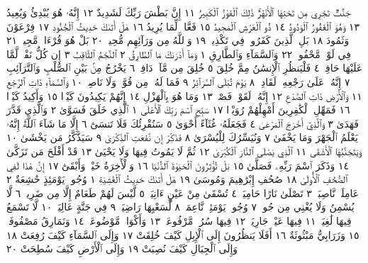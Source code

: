 جَنَّٰتࣱ تَجْرِي مِن تَحْتِهَا ٱلْأَنْهَٰرُۚ ذَٰلِكَ ٱلْفَوْزُ ٱلْكَبِيرُ ١١ إِنَّ بَطْشَ
رَبِّكَ لَشَدِيدٌ ١٢ إِنَّهُۥ هُوَ يُبْدِئُ وَيُعِيدُ ١٣ وَهُوَ ٱلْغَفُورُ ٱلْوَدُودُ ١٤
ذُو ٱلْعَرْشِ ٱلْمَجِيدُ ١٥ فَعَّالࣱ لِّمَا يُرِيدُ ١٦ هَلْ أَتَىٰكَ حَدِيثُ
ٱلْجُنُودِ ١٧ فِرْعَوْنَ وَثَمُودَ ١٨ بَلِ ٱلَّذِينَ كَفَرُوا۟ فِي تَكْذِيبࣲ ١٩ وَٱللَّهُ
مِن وَرَآئِهِم مُّحِيطُۢ ٢٠ بَلْ هُوَ قُرْءَانࣱ مَّجِيدࣱ ٢١ فِي لَوْحࣲ مَّحْفُوظِۭ ٢٢
وَٱلسَّمَآءِ وَٱلطَّارِقِ ١ وَمَآ أَدْرَىٰكَ مَا ٱلطَّارِقُ ٢ ٱلنَّجْمُ ٱلثَّاقِبُ ٣
إِن كُلُّ نَفْسࣲ لَّمَّا عَلَيْهَا حَافِظࣱ ٤ فَلْيَنظُرِ ٱلْإِنسَٰنُ مِمَّ خُلِقَ ٥
خُلِقَ مِن مَّآءࣲ دَافِقࣲ ٦ يَخْرُجُ مِنۢ بَيْنِ ٱلصُّلْبِ وَٱلتَّرَآئِبِ ٧ إِنَّهُۥ
عَلَىٰ رَجْعِهِۦ لَقَادِرࣱ ٨ يَوْمَ تُبْلَى ٱلسَّرَآئِرُ ٩ فَمَا لَهُۥ مِن قُوَّةࣲ وَلَا
نَاصِرࣲ ١٠ وَٱلسَّمَآءِ ذَاتِ ٱلرَّجْعِ ١١ وَٱلْأَرْضِ ذَاتِ ٱلصَّدْعِ ١٢
إِنَّهُۥ لَقَوْلࣱ فَصْلࣱ ١٣ وَمَا هُوَ بِٱلْهَزْلِ ١٤ إِنَّهُمْ يَكِيدُونَ كَيْدࣰا ١٥
وَأَكِيدُ كَيْدࣰا ١٦ فَمَهِّلِ ٱلْكَٰفِرِينَ أَمْهِلْهُمْ رُوَيْدَۢا ١٧
سَبِّحِ ٱسْمَ رَبِّكَ ٱلْأَعْلَى ١ ٱلَّذِي خَلَقَ فَسَوَّىٰ ٢ وَٱلَّذِي قَدَّرَ
فَهَدَىٰ ٣ وَٱلَّذِيٓ أَخْرَجَ ٱلْمَرْعَىٰ ٤ فَجَعَلَهُۥ غُثَآءً أَحْوَىٰ ٥
سَنُقْرِئُكَ فَلَا تَنسَىٰٓ ٦ إِلَّا مَا شَآءَ ٱللَّهُۚ إِنَّهُۥ يَعْلَمُ ٱلْجَهْرَ وَمَا يَخْفَىٰ ٧
وَنُيَسِّرُكَ لِلْيُسْرَىٰ ٨ فَذَكِّرْ إِن نَّفَعَتِ ٱلذِّكْرَىٰ ٩ سَيَذَّكَّرُ مَن يَخْشَىٰ ١٠
وَيَتَجَنَّبُهَا ٱلْأَشْقَى ١١ ٱلَّذِي يَصْلَى ٱلنَّارَ ٱلْكُبْرَىٰ ١٢ ثُمَّ لَا يَمُوتُ
فِيهَا وَلَا يَحْيَىٰ ١٣ قَدْ أَفْلَحَ مَن تَزَكَّىٰ ١٤ وَذَكَرَ ٱسْمَ رَبِّهِۦ فَصَلَّىٰ ١٥
بَلْ تُؤْثِرُونَ ٱلْحَيَوٰةَ ٱلدُّنْيَا ١٦ وَٱلْأٓخِرَةُ خَيْرࣱ وَأَبْقَىٰٓ ١٧ إِنَّ
هَٰذَا لَفِي ٱلصُّحُفِ ٱلْأُولَىٰ ١٨ صُحُفِ إِبْرَٰهِيمَ وَمُوسَىٰ ١٩
هَلْ أَتَىٰكَ حَدِيثُ ٱلْغَٰشِيَةِ ١ وُجُوهࣱ يَوْمَئِذٍ خَٰشِعَةٌ ٢ عَامِلَةࣱ
نَّاصِبَةࣱ ٣ تَصْلَىٰ نَارًا حَامِيَةࣰ ٤ تُسْقَىٰ مِنْ عَيْنٍ ءَانِيَةࣲ ٥ لَّيْسَ
لَهُمْ طَعَامٌ إِلَّا مِن ضَرِيعࣲ ٦ لَّا يُسْمِنُ وَلَا يُغْنِي مِن جُوعࣲ ٧ وُجُوهࣱ
يَوْمَئِذࣲ نَّاعِمَةࣱ ٨ لِّسَعْيِهَا رَاضِيَةࣱ ٩ فِي جَنَّةٍ عَالِيَةࣲ ١٠ لَّا تَسْمَعُ
فِيهَا لَٰغِيَةࣰ ١١ فِيهَا عَيْنࣱ جَارِيَةࣱ ١٢ فِيهَا سُرُرࣱ مَّرْفُوعَةࣱ ١٣ وَأَكْوَابࣱ
مَّوْضُوعَةࣱ ١٤ وَنَمَارِقُ مَصْفُوفَةࣱ ١٥ وَزَرَابِيُّ مَبْثُوثَةٌ ١٦ أَفَلَا يَنظُرُونَ
إِلَى ٱلْإِبِلِ كَيْفَ خُلِقَتْ ١٧ وَإِلَى ٱلسَّمَآءِ كَيْفَ رُفِعَتْ ١٨ وَإِلَى
ٱلْجِبَالِ كَيْفَ نُصِبَتْ ١٩ وَإِلَى ٱلْأَرْضِ كَيْفَ سُطِحَتْ ٢٠
